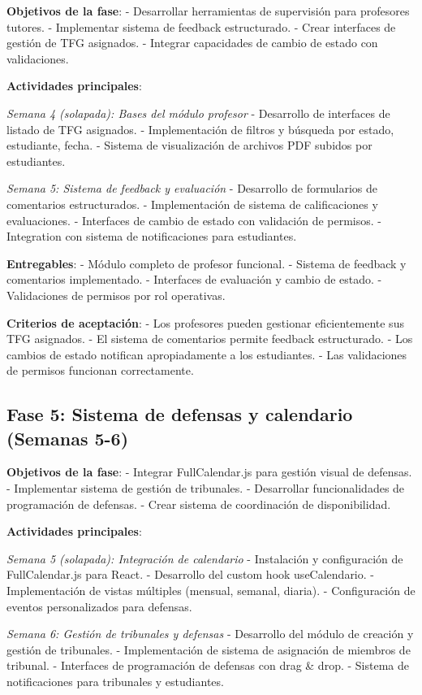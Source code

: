 \documentclass[12pt,a4paper,oneside]{report}
\begin{document}
\textbf{Objetivos de la fase}: - Desarrollar herramientas de supervisión
para profesores tutores. - Implementar sistema de feedback estructurado.
- Crear interfaces de gestión de TFG asignados. - Integrar capacidades
de cambio de estado con validaciones.

\textbf{Actividades principales}:

\emph{Semana 4 (solapada): Bases del módulo profesor} - Desarrollo de
interfaces de listado de TFG asignados. - Implementación de filtros y
búsqueda por estado, estudiante, fecha. - Sistema de visualización de
archivos PDF subidos por estudiantes.

\emph{Semana 5: Sistema de feedback y evaluación} - Desarrollo de
formularios de comentarios estructurados. - Implementación de sistema de
calificaciones y evaluaciones. - Interfaces de cambio de estado con
validación de permisos. - Integration con sistema de notificaciones para
estudiantes.

\textbf{Entregables}: - Módulo completo de profesor funcional. - Sistema
de feedback y comentarios implementado. - Interfaces de evaluación y
cambio de estado. - Validaciones de permisos por rol operativas.

\textbf{Criterios de aceptación}: - Los profesores pueden gestionar
eficientemente sus TFG asignados. - El sistema de comentarios permite
feedback estructurado. - Los cambios de estado notifican apropiadamente
a los estudiantes. - Las validaciones de permisos funcionan
correctamente.

\subsection{Fase 5: Sistema de defensas y calendario (Semanas
5-6)}\label{fase-5-sistema-de-defensas-y-calendario-semanas-5-6}

\textbf{Objetivos de la fase}: - Integrar FullCalendar.js para gestión
visual de defensas. - Implementar sistema de gestión de tribunales. -
Desarrollar funcionalidades de programación de defensas. - Crear sistema
de coordinación de disponibilidad.

\textbf{Actividades principales}:

\emph{Semana 5 (solapada): Integración de calendario} - Instalación y
configuración de FullCalendar.js para React. - Desarrollo del custom
hook useCalendario. - Implementación de vistas múltiples (mensual,
semanal, diaria). - Configuración de eventos personalizados para
defensas.

\emph{Semana 6: Gestión de tribunales y defensas} - Desarrollo del
módulo de creación y gestión de tribunales. - Implementación de sistema
de asignación de miembros de tribunal. - Interfaces de programación de
defensas con drag \& drop. - Sistema de notificaciones para tribunales y
estudiantes.
\end{document}
